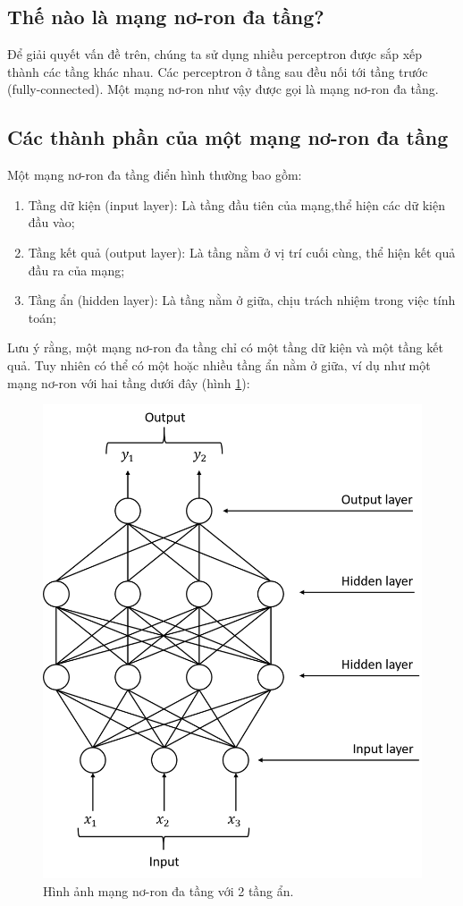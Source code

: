 \subsection{Thế nào là mạng nơ-ron đa tầng?}
\label{subsec:whatIsMLP}
Để giải quyết vấn đề trên, chúng ta sử dụng nhiều perceptron được sắp xếp thành các tầng khác nhau. Các perceptron ở tầng sau đều nối tới tầng trước (fully-connected). Một mạng nơ-ron như vậy được gọi là mạng nơ-ron đa tầng.
 
\subsection{Các thành phần của một mạng nơ-ron đa tầng}
\label{subsec:structureOfMLP}
Một mạng nơ-ron đa tầng điển hình thường bao gồm:
\begin{enumerate}
\item Tầng dữ kiện (input layer): Là tầng đầu tiên của mạng,thể hiện các dữ kiện đầu vào;
\item Tầng kết quả (output layer): Là tầng nằm ở vị trí cuối cùng, thể hiện kết quả đầu ra của mạng;
\item Tầng ẩn (hidden layer): Là tầng nằm ở giữa, chịu trách nhiệm trong việc tính toán;
\end{enumerate}

Lưu ý rằng, một mạng nơ-ron đa tầng chỉ có một tầng dữ kiện và một tầng kết quả. Tuy nhiên có thể có một hoặc nhiều tầng ẩn nằm ở giữa, ví dụ như một mạng nơ-ron với hai tầng dưới đây (hình \ref{fig:MLP2HiddenLayer}):

\begin{figure}[h]
	\centering
		\includegraphics[width=0.5\columnwidth]{chapter01/figure/Picture3.png}
		\centering
	\caption{Hình ảnh mạng nơ-ron đa tầng với 2 tầng ẩn.}
	\label{fig:MLP2HiddenLayer}
\end{figure}

